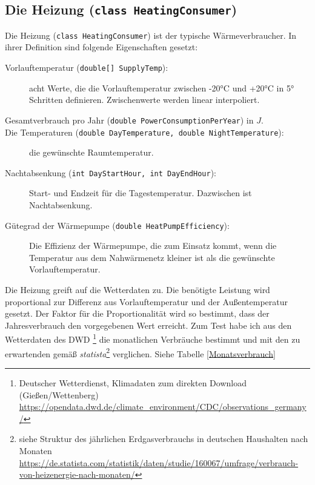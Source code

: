 \documentclass[12pt,a4paper]{article}
\begin{document}
\subsection{Die Heizung (\texttt{class HeatingConsumer})}
Die Heizung (\texttt{class HeatingConsumer}) ist der typische Wärmeverbraucher. In ihrer Definition sind folgende Eigenschaften gesetzt:
\begin{description}
\item[Vorlauftemperatur (\texttt{double[] SupplyTemp}):] acht Werte, die die Vorlauftemperatur zwischen -20°C und +20°C in 5° Schritten definieren. Zwischenwerte werden linear interpoliert.
\item[Gesamtverbrauch pro Jahr (\texttt{double PowerConsumptionPerYear}) in $J$.]
\item[Die Temperaturen (\texttt{double DayTemperature, double NightTemperature}):] die gewünschte Raumtemperatur.
\item[Nachtabsenkung (\texttt{int DayStartHour, int DayEndHour}):]
 Start- und Endzeit für die Tagestemperatur. Dazwischen ist Nachtabsenkung.
\item[Gütegrad der Wärmepumpe (\texttt{double HeatPumpEfficiency}):]
Die Effizienz der Wärmepumpe, die zum Einsatz kommt, wenn die Temperatur aus dem Nahwärmenetz kleiner ist als die gewünschte Vorlauftemperatur.
\end{description}
Die Heizung greift auf die Wetterdaten zu. Die benötigte Leistung wird proportional zur Differenz aus Vorlauftemperatur und der Außentemperatur gesetzt. Der Faktor für die Proportionalität wird  so bestimmt, dass der Jahresverbrauch den vorgegebenen Wert erreicht. Zum Test habe ich aus den Wetterdaten des DWD \footnote{Deutscher Wetterdienst, Klimadaten zum direkten Download (Gießen/Wettenberg) \url{https://opendata.dwd.de/climate_environment/CDC/observations_germany/}} die monatlichen Verbräuche bestimmt und mit den zu erwartenden gemäß \emph{statista}\footnote{siehe Struktur des jährlichen Erdgasverbrauchs in deutschen Haushalten nach Monaten \url{https://de.statista.com/statistik/daten/studie/160067/umfrage/verbrauch-von-heizenergie-nach-monaten/}} verglichen. Siehe Tabelle \ref{Monatsverbrauch}
\end{document}
